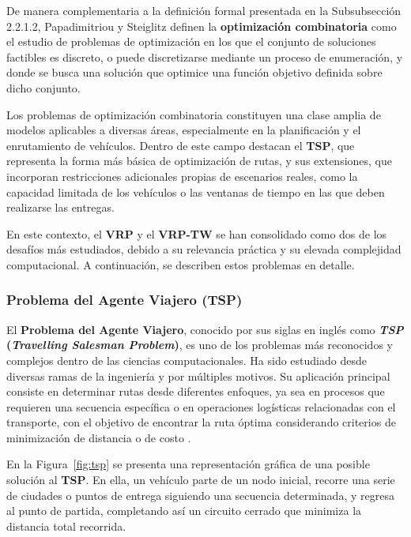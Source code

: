 \documentclass[12pt,titlepage,twoside,openright]{book}
\begin{document}
De manera complementaria a la definición formal presentada en la Subsubsección 2.2.1.2, Papadimitriou y Steiglitz \citep{papadimitriou1998} definen la \textbf{optimización combinatoria} como el estudio de problemas de optimización en los que el conjunto de soluciones factibles es discreto, o puede discretizarse mediante un proceso de enumeración, y donde se busca una solución que optimice una función objetivo definida sobre dicho conjunto.

Los problemas de optimización combinatoria constituyen una clase amplia de modelos aplicables a diversas áreas, especialmente en la planificación y el enrutamiento de vehículos. Dentro de este campo destacan el \textbf{TSP}, que representa la forma más básica de optimización de rutas, y sus extensiones, que incorporan restricciones adicionales propias de escenarios reales, como la capacidad limitada de los vehículos o las ventanas de tiempo en las que deben realizarse las entregas.

En este contexto, el \textbf{VRP} y el \textbf{VRP-TW} se han consolidado como dos de los desafíos más estudiados, debido a su relevancia práctica y su elevada complejidad computacional. A continuación, se describen estos problemas en detalle.
\subsubsection{Problema del Agente Viajero (TSP)}
\label{subsec:problem_tsp}

El \textbf{Problema del Agente Viajero}, conocido por sus siglas en inglés como \textbf{\textit{TSP} (\emph{Travelling Salesman Problem})}, es uno de los problemas más reconocidos y complejos dentro de las ciencias computacionales. Ha sido estudiado desde diversas ramas de la ingeniería y por múltiples motivos. Su aplicación principal consiste en determinar rutas desde diferentes enfoques, ya sea en procesos que requieren una secuencia específica o en operaciones logísticas relacionadas con el transporte, con el objetivo de encontrar la ruta óptima considerando criterios de minimización de distancia o de costo \citep{lopez2014tabu}.

En la Figura~\ref{fig:tsp} se presenta una representación gráfica de una posible solución al \textbf{TSP}. En ella, un vehículo parte de un nodo inicial, recorre una serie de ciudades o puntos de entrega siguiendo una secuencia determinada, y regresa al punto de partida, completando así un circuito cerrado que minimiza la distancia total recorrida.
\end{document}
